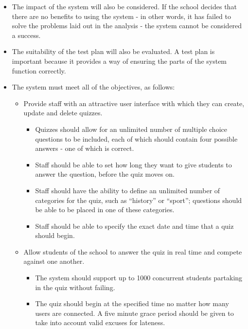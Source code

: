\begin{itemize}
\item The impact of the system will also be considered. If the school decides that there are no benefits to using the system - in other words, it has failed to solve the problems laid out in the analysis - the system cannot be considered a success.

\item The suitability of the test plan will also be evaluated. A test plan is important because it provides a way of ensuring the parts of the system function correctly.

\item The system must meet all of the objectives, as follows:

\begin{itemize}
	\item Provide staff with an attractive user interface with which they can create, update and delete quizzes.

		\begin{itemize}
			\item Quizzes should allow for an unlimited number of multiple choice questions to be included, each of which should contain four possible answers - one of which is correct.

			\item Staff should be able to set how long they want to give students to answer the question, before the quiz moves on.

			\item Staff should have the ability to define an unlimited number of categories for the quiz, such as ``history'' or ``sport''; questions should be able to be placed in one of these categories.

			\item Staff should be able to specify the exact date and time that a quiz should begin.
		\end{itemize}

	\item Allow students of the school to answer the quiz in real time and compete against one another.

		\begin{itemize}
			\item The system should support up to 1000 concurrent students partaking in the quiz without failing.

			\item The quiz should begin at the specified time no matter how many users are connected. A five minute grace period should be given to take into account valid excuses for lateness.


\end{itemize}
\end{itemize}
\end{itemize}
